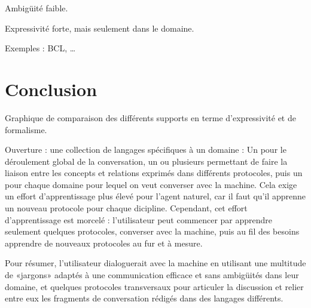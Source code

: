 \documentclass[french,a4paper]{article}
\begin{document}
Ambigüité faible.

Expressivité forte, mais seulement dans le domaine.

Exemples : BCL, …

\section{Conclusion}
Graphique de comparaison des différents supports en terme d'expressivité et de formalisme.

Ouverture : une collection de langages spécifiques à un domaine : Un pour le déroulement global de la conversation, un ou plusieurs
permettant de faire la liaison entre les concepts et relations exprimés dans différents protocoles, puis un pour chaque domaine pour lequel
on veut converser avec la machine. Cela exige un effort d'apprentissage plus élevé pour l'agent naturel, car il faut qu'il apprenne un
nouveau protocole pour chaque dicipline. Cependant, cet effort d'apprentissage est morcelé : l'utilisateur peut commencer par apprendre
seulement quelques protocoles, converser avec la machine, puis au fil des besoins apprendre de nouveaux protocoles au fur et à mesure.

Pour résumer, l'utilisateur dialoguerait avec la machine en utilisant une multitude de «jargons» adaptés à une communication efficace et
sans ambigüités dans leur domaine, et quelques protocoles transversaux pour articuler la discussion et relier entre eux les fragments de
conversation rédigés dans des langages différents.

\end{document}
